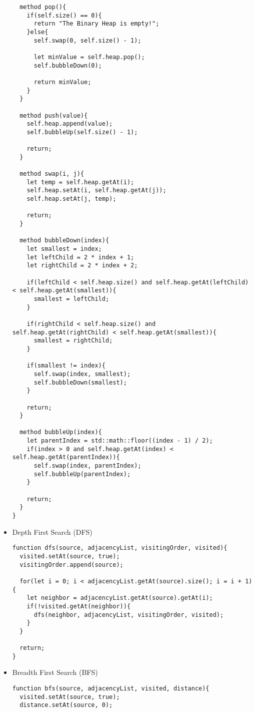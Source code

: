 \begin{itemize}
\begin{lstlisting}
  method pop(){
    if(self.size() == 0){
      return "The Binary Heap is empty!";
    }else{
      self.swap(0, self.size() - 1);

      let minValue = self.heap.pop();
      self.bubbleDown(0);

      return minValue;
    }
  }

  method push(value){
    self.heap.append(value);
    self.bubbleUp(self.size() - 1);

    return;
  }

  method swap(i, j){
    let temp = self.heap.getAt(i);
    self.heap.setAt(i, self.heap.getAt(j));
    self.heap.setAt(j, temp);

    return;
  }

  method bubbleDown(index){
    let smallest = index;
    let leftChild = 2 * index + 1;
    let rightChild = 2 * index + 2;

    if(leftChild < self.heap.size() and self.heap.getAt(leftChild) < self.heap.getAt(smallest)){
      smallest = leftChild;
    }

    if(rightChild < self.heap.size() and self.heap.getAt(rightChild) < self.heap.getAt(smallest)){
      smallest = rightChild;
    }

    if(smallest != index){
      self.swap(index, smallest);
      self.bubbleDown(smallest);
    }

    return;
  }

  method bubbleUp(index){
    let parentIndex = std::math::floor((index - 1) / 2);
    if(index > 0 and self.heap.getAt(index) < self.heap.getAt(parentIndex)){
      self.swap(index, parentIndex);
      self.bubbleUp(parentIndex);
    }

    return;
  }
}
        \end{lstlisting}


    \item Depth First Search (DFS)
        \begin{lstlisting}
function dfs(source, adjacencyList, visitingOrder, visited){
  visited.setAt(source, true);
  visitingOrder.append(source);

  for(let i = 0; i < adjacencyList.getAt(source).size(); i = i + 1){
    let neighbor = adjacencyList.getAt(source).getAt(i);
    if(!visited.getAt(neighbor)){
      dfs(neighbor, adjacencyList, visitingOrder, visited);
    }
  }

  return;
}
        \end{lstlisting}

        
    \item Breadth First Search (BFS)
        \begin{lstlisting}
function bfs(source, adjacencyList, visited, distance){
  visited.setAt(source, true);
  distance.setAt(source, 0);


\end{lstlisting}
\end{itemize}
